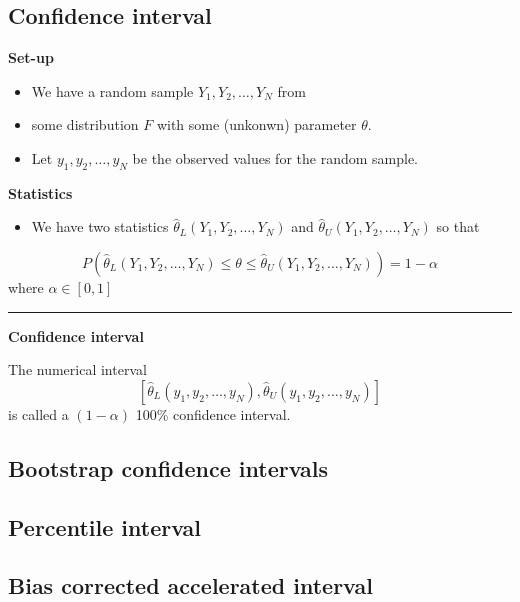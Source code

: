 \documentclass[
  letterpaper,
  DIV=11,
  numbers=noendperiod]{scrartcl}
\providecommand{\tightlist}{%
  \setlength{\itemsep}{0pt}\setlength{\parskip}{0pt}}\usepackage{longtable,booktabs,array}
\begin{document}
\hypertarget{confidence-interval}{%
\subsection{Confidence interval}\label{confidence-interval}}

\textbf{Set-up}

\begin{itemize}
\tightlist
\item
  We have a random sample \(Y_1,Y_2,\ldots,Y_N\) from
\item
  some distribution \(F\) with some (unkonwn) parameter \(\theta\).
\item
  Let \(y_1,y_2,\ldots,y_N\) be the observed values for the random
  sample.
\end{itemize}

\textbf{Statistics}

\begin{itemize}
\tightlist
\item
  We have two statistics \(\hat{\theta}_L(Y_1,Y_2,\ldots,Y_N)\) and
  \(\hat{\theta}_U(Y_1,Y_2,\ldots,Y_N)\) so that
\end{itemize}

\[P(\hat{\theta}_L(Y_1,Y_2,\ldots,Y_N)\le \theta \le \hat{\theta}_U(Y_1,Y_2,\ldots,Y_N))=1-\alpha\]
where \(\alpha\in [0,1]\)

\begin{center}\rule{0.5\linewidth}{0.5pt}\end{center}

\textbf{Confidence interval}

The numerical interval
\[[\hat{\theta}_L(y_1,y_2,\ldots,y_N),\hat{\theta}_U(y_1,y_2,\ldots,y_N)]\]
is called a \((1-\alpha)\) 100\% confidence interval.

\hypertarget{bootstrap-confidence-intervals}{%
\subsection{Bootstrap confidence
intervals}\label{bootstrap-confidence-intervals}}

\hypertarget{percentile-interval}{%
\subsection{Percentile interval}\label{percentile-interval}}

\hypertarget{bias-corrected-accelerated-interval}{%
\subsection{Bias corrected accelerated
interval}\label{bias-corrected-accelerated-interval}}
\end{document}
